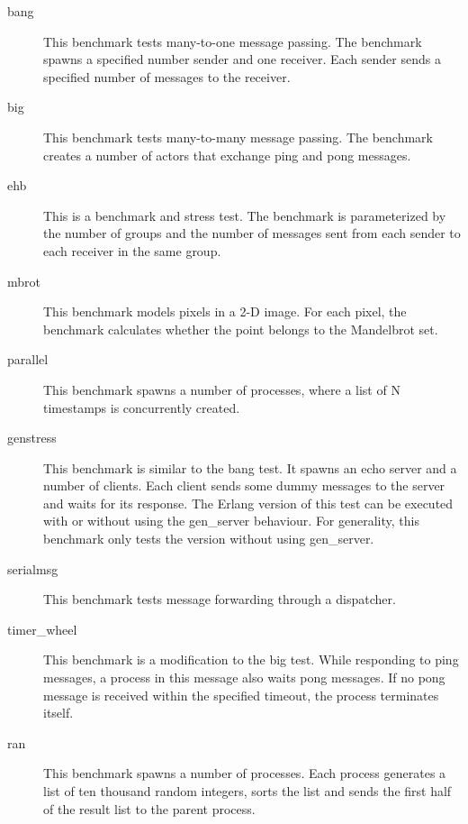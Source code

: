 \begin{description}
  \item [bang] This benchmark tests many-to-one message passing.  The benchmark
spawns a specified number sender and one receiver.  Each sender sends a
specified number of messages to the receiver.
  \item [big] This benchmark tests many-to-many message passing.  The benchmark
creates a number of actors that exchange ping and pong messages.
  \item [ehb] This is a benchmark and stress test.  The benchmark is
parameterized by the number of groups and the number of messages sent from each
sender to each receiver in the same group.
  \item [mbrot] This benchmark models pixels in a 2-D image.  For each pixel,
the benchmark calculates whether the point belongs to the Mandelbrot set.
  \item [parallel] This benchmark spawns a number of processes, where a list of
N timestamps is concurrently created.
  \item [genstress] This benchmark is similar to the bang test.  It spawns an
echo server and a number of clients.  Each client sends some dummy messages to
the server and waits for its response.  The Erlang version of this test can be
executed with or without using the gen\_server behaviour.  For generality, this
benchmark only tests the version without using gen\_server.
  \item [serialmsg] This benchmark tests message forwarding through a
dispatcher.
  \item [timer\_wheel] This benchmark is a modification to the big test.  While
responding to ping messages, a process in this message also waits pong messages.
 If no pong message is received within the specified timeout, the process
terminates itself.
  \item [ran] This benchmark spawns a number of processes.  Each process
generates a list of ten thousand random integers, sorts the list and sends the
first half of the result list to the parent process.
\end{description}